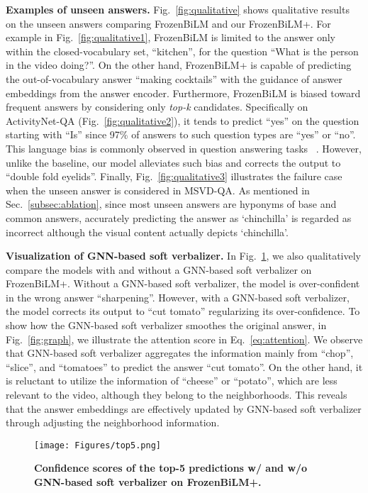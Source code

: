 \documentclass[10pt,twocolumn,letterpaper]{article}
\begin{document}
\noindent \textbf{Examples of unseen answers.}
Fig.~\ref{fig:qualitative} shows qualitative results on the unseen answers comparing FrozenBiLM and our FrozenBiLM+.
For example in Fig.~\ref{fig:qualitative1}, FrozenBiLM is limited to the answer only within the closed-vocabulary set, ``kitchen'', for the question ``What is the person in the video doing?''. 
On the other hand, FrozenBiLM+ is capable of predicting the out-of-vocabulary answer ``making cocktails'' with the guidance of answer embeddings from the answer encoder. 
Furthermore, FrozenBiLM is biased toward frequent answers by considering only \textit{top-k} candidates.
Specifically on ActivityNet-QA (Fig.~\ref{fig:qualitative2}), it tends to predict ``yes'' on the question starting with ``Is'' since 97\% of answers to such question types are ``yes'' or ``no''.
This language bias is commonly observed in question answering tasks ~\cite{niu2021counterfactual, ramakrishnan2018overcoming, cadene2019rubi}. 
However, unlike the baseline, our model alleviates such bias and corrects the output to ``double fold eyelids''.
Finally, Fig.~\ref{fig:qualitative3} illustrates the failure case when the unseen answer is considered in MSVD-QA.
As mentioned in Sec.~\ref{subsec:ablation}, since most unseen answers are hyponyms of base and common answers, accurately predicting the answer as `chinchilla' is regarded as incorrect although the visual content actually depicts `chinchilla'.

\noindent \textbf{Visualization of GNN-based soft verbalizer.}
In Fig.~\ref{fig:top5}, we also qualitatively compare the models with and without a GNN-based soft verbalizer on FrozenBiLM+.
Without a GNN-based soft verbalizer, the model is over-confident in the wrong answer ``sharpening''.
However, with a GNN-based soft verbalizer, the model corrects its output to ``cut tomato'' regularizing its over-confidence.
To show how the GNN-based soft verbalizer smoothes the original answer, in Fig.~\ref{fig:graph}, we illustrate the attention score  in Eq.~\eqref{eq:attention}.
We observe that GNN-based soft verbalizer aggregates the information mainly from ``chop'', ``slice'', and ``tomatoes'' to predict the answer ``cut tomato''.
On the other hand, it is reluctant to utilize the information of ``cheese'' or ``potato'', which are less relevant to the video, although they belong to the neighborhoods. 
This reveals that the answer embeddings are effectively updated by GNN-based soft verbalizer through adjusting the neighborhood information. \begin{figure}[t] 
    \centering
        \texttt{[image: Figures/top5.png]}
        \caption{\textbf{Confidence scores of the top-5 predictions w/ and w/o GNN-based soft verbalizer on FrozenBiLM+.}}
        \label{fig:top5}
\end{figure}
\end{document}
